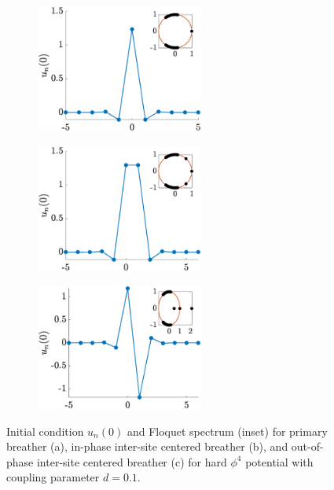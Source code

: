 \documentclass[12pt,reqno]{amsart}
\theoremstyle{definition}
\begin{document}
\begin{figure}
	\begin{center}
	\begin{subfigure}{0.3\linewidth}
		\caption{}
		\includegraphics[width=5.5cm]{phi4single.eps} \hspace{-0.5cm}
		\label{fig:phi4sola} 
	\end{subfigure}
	\begin{subfigure}{0.3\linewidth}
		\caption{}
		\includegraphics[width=5.5cm]{intersitephi4inphase.eps} \hspace{-0.5cm}
		\label{fig:phi4solb} 
	\end{subfigure}
	\begin{subfigure}{0.3\linewidth}
		\caption{}
		\includegraphics[width=5.5cm]{intersitephi4opposite.eps} 
		\label{fig:phi4solc} 
	\end{subfigure}
	\end{center}
	\caption{Initial condition $u_n(0)$ and Floquet spectrum (inset) for primary breather (a), in-phase inter-site centered breather (b), and out-of-phase inter-site centered breather (c) for hard $\phi^4$ potential with coupling parameter $d=0.1$. }
	\label{fig:phi4sol}
\end{figure}
\end{document}
